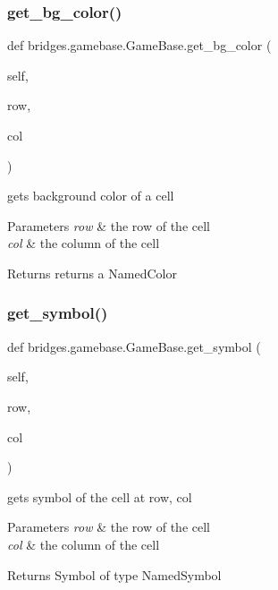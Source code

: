 \subsubsection{\texorpdfstring{get\+\_\+bg\+\_\+color()}{get\_bg\_color()}}
{\footnotesize\ttfamily def bridges.\+gamebase.\+Game\+Base.\+get\+\_\+bg\+\_\+color (\begin{DoxyParamCaption}\item[{}]{self,  }\item[{}]{row,  }\item[{}]{col }\end{DoxyParamCaption})}



gets background color of a cell 


\begin{DoxyParams}{Parameters}
{\em row} & the row of the cell \\
\hline
{\em col} & the column of the cell\\
\hline
\end{DoxyParams}
\begin{DoxyReturn}{Returns}
returns a Named\+Color 
\end{DoxyReturn}
\mbox{\label{classbridges_1_1gamebase_1_1_game_base_a80a3f5e32f8d0ad45c3f72d3c3e134e3}} 
\subsubsection{\texorpdfstring{get\+\_\+symbol()}{get\_symbol()}}
{\footnotesize\ttfamily def bridges.\+gamebase.\+Game\+Base.\+get\+\_\+symbol (\begin{DoxyParamCaption}\item[{}]{self,  }\item[{}]{row,  }\item[{}]{col }\end{DoxyParamCaption})}



gets symbol of the cell at row, col 


\begin{DoxyParams}{Parameters}
{\em row} & the row of the cell \\
\hline
{\em col} & the column of the cell\\
\hline
\end{DoxyParams}
\begin{DoxyReturn}{Returns}
Symbol of type Named\+Symbol 
\end{DoxyReturn}
\mbox{\label{classbridges_1_1gamebase_1_1_game_base_a7cb6637713536701e89e870a5a3428a1}} 
